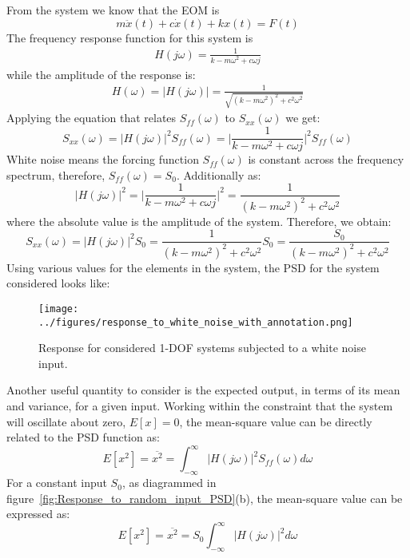 \documentclass[12pt,letter]{article}
\begin{document}
\begin{example}
	\noindent From the system we know that the EOM is 
	\begin{equation}
	m\ddot{x}(t) +c\dot{x}(t) + kx(t) = F(t)
	\end{equation} 
	The frequency response function for this system is 
	\begin{eqnarray}
		H(j\omega) = \frac{1}{k-m\omega^2+c\omega j}
	\end{eqnarray}
	while the amplitude of the response is:
	\begin{eqnarray}
	H(\omega) = |H(j\omega)| = \frac{1}{\sqrt{(k-m\omega^2)^2+c^2\omega^2}}
	\end{eqnarray}
	Applying the equation that relates $S_{ff}(\omega)$ to $S_{xx}(\omega)$ we get:
	\begin{equation}
	S_{xx}(\omega) =  |H(j\omega)|^2 S_{ff}(\omega) = \bigg|\frac{1}{k-m\omega^2+c\omega j} \bigg|^2 S_{ff}(\omega) 
	\end{equation}
	White noise means the forcing function $S_{ff}(\omega)$ is constant across the frequency spectrum, therefore, $S_{ff}(\omega)=S_0$. Additionally as:
	\begin{equation}
	|H(j\omega)|^2 = \bigg|\frac{1}{k-m\omega^2+c\omega j} \bigg|^2 = \frac{1}{(k-m\omega^2)^2+c^2\omega^2}
	\end{equation}
	where the absolute value is the amplitude of the system. Therefore, we obtain:
	\begin{equation}
	S_{xx}(\omega) =  |H(j\omega)|^2 S_{0}= \frac{1}{(k-m\omega^2)^2+c^2\omega^2}S_0 = \frac{S_0}{(k-m\omega^2)^2+c^2\omega^2}
	\end{equation}
	\pagebreak
	Using various values for the elements in the system, the PSD for the system considered looks like:
	\begin{figure}[H]
		\centering
		\texttt{[image: ../figures/response\_to\_white\_noise\_with\_annotation.png]}
		\caption{Response for considered 1-DOF systems subjected to a white noise input.}
	\end{figure}
\end{example}  

Another useful quantity to consider is the expected output, in terms of its mean and variance, for a given input. Working within the constraint that the system will oscillate about zero, $E[x]=0$, the mean-square value can be directly related to the PSD function as:
\begin{equation}
E[x^2] = \overline{x^2} =   \int_{-\infty}^{\infty} |H(j\omega)|^2 S_{ff}(\omega) d\omega
\end{equation}
For a constant input $S_0$, as diagrammed in figure~\ref{fig:Response_to_random_input_PSD}(b), the mean-square value can be expressed as:
\begin{equation}
E[x^2] = \overline{x^2} =   S_{0} \int_{-\infty}^{\infty} |H(j\omega)|^2 d\omega
\label{eq:variance_for_S_O}
\end{equation}
\end{document}
